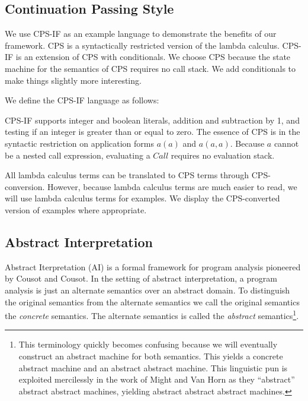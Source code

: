 \documentclass{article}
\begin{document}

\subsection{Continuation Passing Style}
\label{section:Background:ContinuationPassingStyle}

We use CPS-IF as an example language to demonstrate the benefits of our framework.
CPS is a syntactically restricted version of the lambda calculus.
CPS-IF is an extension of CPS with conditionals.
We choose CPS because the state machine for the semantics of CPS requires no call stack.
We add conditionals to make things slightly more interesting.

We define the CPS-IF language as follows:


CPS-IF supports integer and boolean literals, addition and subtraction by 1, and testing if an integer is greater than or equal to zero.
The essence of CPS is in the syntactic restriction on application forms $a(a)$ and $a(a,a)$.  
Because $a$ cannot be a nested call expression, evaluating a $Call$ requires no evaluation stack.

All lambda calculus terms can be translated to CPS terms through CPS-conversion.
However, because lambda calculus terms are much easier to read, we will use lambda calculus terms for examples.
We display the CPS-converted version of examples where appropriate.


\subsection{Abstract Interpretation}
\label{section:Background:AbstractInterpretation}

Abstract Iterpretation (AI) is a formal framework for program analysis pioneered by Cousot and Cousot.
In the setting of abstract interpretation, a program analysis is just an alternate semantics over an abstract domain.
To distinguish the original semantics from the alternate semantics we call the original semantics the \emph{concrete} semantics.
The alternate semantics is called the \emph{abstract} semantics\footnote{
  This terminology quickly becomes confusing because we will eventually construct an abstract machine for both semantics.
  This yields a concrete abstract machine and an abstract abstract machine. 
  This linguistic pun is exploited mercilessly in the work of Might and Van Horn as they “abstract” abstract abstract machines, yielding abstract abstract abstract machines.
}.
\end{document}
